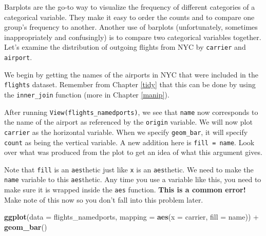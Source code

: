 \documentclass[]{tufte-book}
\newenvironment{Shaded}{\begin{snugshade}}{\end{snugshade}}
\newcommand{\KeywordTok}[1]{\textcolor[rgb]{0.13,0.29,0.53}{\textbf{{#1}}}}
\newcommand{\DataTypeTok}[1]{\textcolor[rgb]{0.13,0.29,0.53}{{#1}}}
\newcommand{\StringTok}[1]{\textcolor[rgb]{0.31,0.60,0.02}{{#1}}}
\newcommand{\NormalTok}[1]{{#1}}
\begin{document}
Barplots are the go-to way to visualize the frequency of different
categories of a categorical variable. They make it easy to order the
counts and to compare one group's frequency to another. Another use of
barplots (unfortunately, sometimes inappropriately and confusingly) is
to compare two categorical variables together. Let's examine the
distribution of outgoing flights from NYC by \texttt{carrier} and
\texttt{airport}.

We begin by getting the names of the airports in NYC that were included
in the \texttt{flights} dataset. Remember from Chapter \ref{tidy} that
this can be done by using the \texttt{inner\_join} function (more in
Chapter \ref{manip}).

\begin{Shaded}
\end{Shaded}

After running \texttt{View(flights\_namedports)}, we see that
\texttt{name} now corresponds to the name of the airport as referenced
by the \texttt{origin} variable. We will now plot \texttt{carrier} as
the horizontal variable. When we specify \texttt{geom\_bar}, it will
specify \texttt{count} as being the vertical variable. A new addition
here is \texttt{fill\ =\ name}. Look over what was produced from the
plot to get an idea of what this argument gives.

Note that \texttt{fill} is an \texttt{aes}thetic just like \texttt{x} is
an \texttt{aes}thetic. We need to make the \texttt{name} variable to
this \texttt{aes}thetic. Any time you use a variable like this, you need
to make sure it is wrapped inside the \texttt{aes} function.
\textbf{This is a common error!} Make note of this now so you don't fall
into this problem later.

\begin{Shaded}
\begin{Highlighting}[]
\KeywordTok{ggplot}\NormalTok{(}\DataTypeTok{data =} \NormalTok{flights_namedports, }\DataTypeTok{mapping =} \KeywordTok{aes}\NormalTok{(}\DataTypeTok{x =} \NormalTok{carrier, }\DataTypeTok{fill =} \NormalTok{name)) +}
\StringTok{  }\KeywordTok{geom_bar}\NormalTok{()}
\end{Highlighting}
\end{Shaded}
\end{document}
